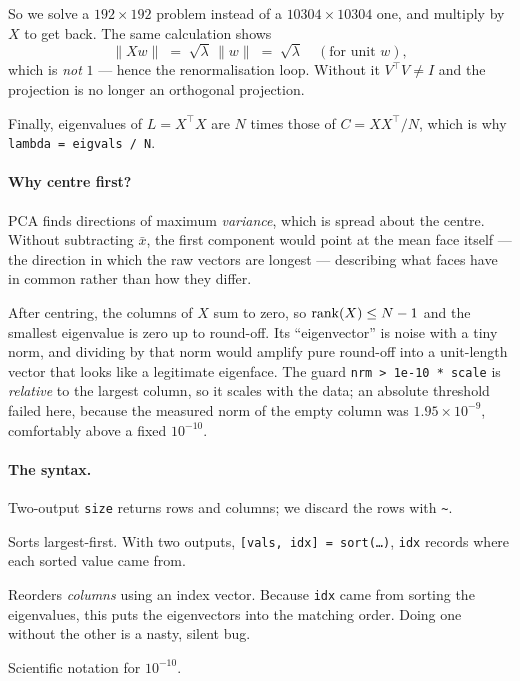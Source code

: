 So we solve a $192\times192$ problem instead of a $10304\times10304$ one, and
multiply by $X$ to get back. The same calculation shows
\[
  \|Xw\| \;=\; \sqrt{\lambda}\,\|w\| \;=\; \sqrt{\lambda} \quad (\text{for unit } w),
\]
which is \emph{not} $1$ --- hence the renormalisation loop. Without it
$V^{\!\top}V \neq I$ and the projection is no longer an orthogonal projection.

Finally, eigenvalues of $L = X^{\!\top}X$ are $N$ times those of
$C = XX^{\!\top}/N$, which is why \texttt{lambda = eigvals / N}.

\paragraph{Why centre first?} PCA finds directions of maximum \emph{variance},
which is spread about the centre. Without subtracting $\bar x$, the first
component would point at the mean face itself --- the direction in which the
raw vectors are longest --- describing what faces have in common rather than
how they differ.

\begin{gotcha}
After centring, the columns of $X$ sum to zero, so $\operatorname{rank}(X) \le N-1$ and the
smallest eigenvalue is zero up to round-off. Its ``eigenvector'' is noise with
a tiny norm, and dividing by that norm would amplify pure round-off into a
unit-length vector that looks like a legitimate eigenface. The guard
\texttt{nrm > 1e-10 * scale} is \emph{relative} to the largest column, so it
scales with the data; an absolute threshold failed here, because the measured
norm of the empty column was $1.95\times10^{-9}$, comfortably above a fixed
$10^{-10}$.
\end{gotcha}

\paragraph{The syntax.}
\begin{description}[leftmargin=*,style=nextline,nosep]
\item[\texttt{[\textasciitilde, N] = size(imgs)}] Two-output \texttt{size}
  returns rows and columns; we discard the rows with \texttt{\textasciitilde}.
\item[\texttt{sort(v,'descend')}] Sorts largest-first. With two outputs,
  \texttt{[vals, idx] = sort(\ldots)}, \texttt{idx} records where each sorted
  value came from.
\item[\texttt{Wg(:, idx)}] Reorders \emph{columns} using an index vector.
  Because \texttt{idx} came from sorting the eigenvalues, this puts the
  eigenvectors into the matching order. Doing one without the other is a
  nasty, silent bug.
\item[\texttt{1e-10}] Scientific notation for $10^{-10}$.
\end{description}

